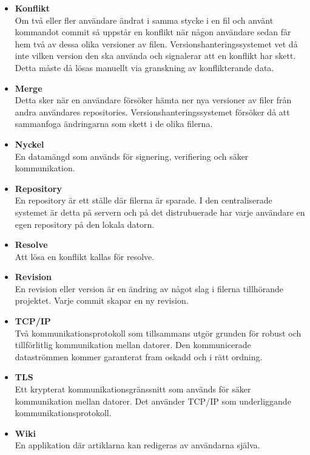 \begin{itemize}
	\item \textbf{Konflikt}
	\\Om två eller fler användare ändrat i samma stycke i en fil och använt kommandot commit så uppstår en konflikt när någon användare sedan får hem två av dessa olika versioner av filen. Versionshanteringssystemet vet då inte vilken version den ska använda och signalerar att en konflikt har skett. Detta måste då lösas manuellt via granskning av konflikterande data.

	\item \textbf{Merge}
	\\Detta sker när en användare försöker hämta ner nya versioner av filer från andra användares repositories. Versionshanteringssystemet försöker då att sammanfoga ändringarna som skett i de olika filerna.

	\item \textbf{Nyckel}
	\\En datamängd som används för signering, verifiering och säker kommunikation.
			
	\item \textbf{Repository}
	\\En repository är ett ställe där filerna är sparade. I den centraliserade systemet är detta på servern och på det distrubuerade har varje användare en egen repository på den lokala datorn.

	\item \textbf{Resolve}
	\\Att lösa en konflikt kallas för resolve.
	
	\item \textbf{Revision}
	\\En revision eller version är en ändring av något slag i filerna tillhörande projektet. Varje commit skapar en ny revision.

        \item \textbf{TCP/IP}
        \\Två kommunikationsprotokoll som tillsammans utgör grunden för robust och tillförlitlig kommunikation mellan datorer. Den kommunicerade dataströmmen kommer garanterat fram oskadd och i rätt ordning.

        \item \textbf{TLS}
        \\Ett krypterat kommunikationsgränssnitt som används för säker kommunikation mellan datorer. Det använder TCP/IP som underliggande kommunikationsprotokoll.
	
	\item \textbf{Wiki} \\
	En applikation där artiklarna kan redigeras av användarna själva.
\end{itemize}

